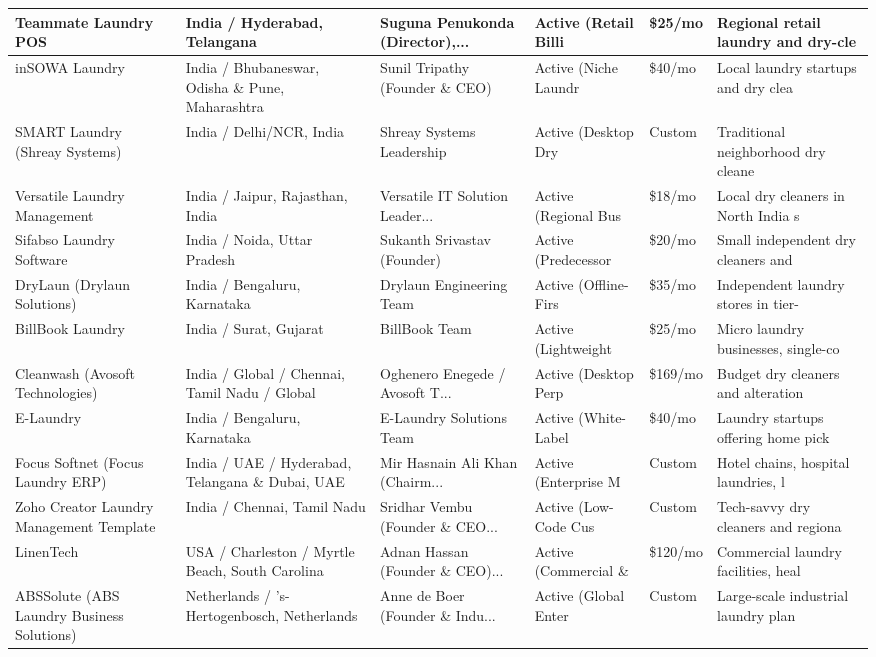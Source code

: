 \documentclass[11pt,a4paper]{article}
\begin{document}
\begin{longtable}{p{3.2cm} p{2.2cm} p{2.5cm} p{2.2cm} p{1.8cm} p{2.5cm}}
\midrule
Teammate Laundry POS & India / Hyderabad, Telangana & Suguna Penukonda (Director),... & Active (Retail Billi & \$25/mo & Regional retail laundry and dry-cle \\
\midrule
inSOWA Laundry & India / Bhubaneswar, Odisha \& Pune, Maharashtra & Sunil Tripathy (Founder \& CEO) & Active (Niche Laundr & \$40/mo & Local laundry startups and dry clea \\
\midrule
SMART Laundry (Shreay Systems) & India / Delhi/NCR, India & Shreay Systems Leadership & Active (Desktop Dry  & Custom & Traditional neighborhood dry cleane \\
\midrule
Versatile Laundry Management & India / Jaipur, Rajasthan, India & Versatile IT Solution Leader... & Active (Regional Bus & \$18/mo & Local dry cleaners in North India s \\
\midrule
Sifabso Laundry Software & India / Noida, Uttar Pradesh & Sukanth Srivastav (Founder) & Active (Predecessor  & \$20/mo & Small independent dry cleaners and  \\
\midrule
DryLaun (Drylaun Solutions) & India / Bengaluru, Karnataka & Drylaun Engineering Team & Active (Offline-Firs & \$35/mo & Independent laundry stores in tier- \\
\midrule
BillBook Laundry & India / Surat, Gujarat & BillBook Team & Active (Lightweight  & \$25/mo & Micro laundry businesses, single-co \\
\midrule
Cleanwash (Avosoft Technologies) & India / Global / Chennai, Tamil Nadu / Global & Oghenero Enegede / Avosoft T... & Active (Desktop Perp & \$169/mo & Budget dry cleaners and alteration  \\
\midrule
E-Laundry & India / Bengaluru, Karnataka & E-Laundry Solutions Team & Active (White-Label  & \$40/mo & Laundry startups offering home pick \\
\midrule
Focus Softnet (Focus Laundry ERP) & India / UAE / Hyderabad, Telangana \& Dubai, UAE & Mir Hasnain Ali Khan (Chairm... & Active (Enterprise M & Custom & Hotel chains, hospital laundries, l \\
\midrule
Zoho Creator Laundry Management Template & India / Chennai, Tamil Nadu & Sridhar Vembu (Founder \& CEO... & Active (Low-Code Cus & Custom & Tech-savvy dry cleaners and regiona \\
\midrule
LinenTech & USA / Charleston / Myrtle Beach, South Carolina & Adnan Hassan (Founder \& CEO)... & Active (Commercial \& & \$120/mo & Commercial laundry facilities, heal \\
\midrule
ABSSolute (ABS Laundry Business Solutions) & Netherlands / ’s-Hertogenbosch, Netherlands & Anne de Boer (Founder \& Indu... & Active (Global Enter & Custom & Large-scale industrial laundry plan \\

\end{longtable}
\end{document}
